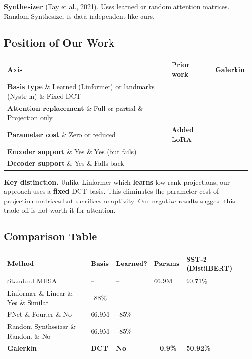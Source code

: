 \textbf{Synthesizer} (Tay et al., 2021). Uses learned or random attention 
matrices. Random Synthesizer is data-independent like ours.

\subsection{Position of Our Work}

\begin{table}[H]
\centering
\small
\begin{tabular}{lll}
\toprule
\textbf{Axis} & \textbf{Prior work} & \textbf{Galerkin} \\
\midrule
\textbf{Basis type} \& Learned (Linformer) or landmarks (Nystr m) \& Fixed DCT \\
\textbf{Attention replacement} \& Full or partial \& Projection only \\
\textbf{Parameter cost} \& Zero or reduced & \textbf{Added LoRA} \\
\textbf{Encoder support} \& Yes \& Yes (but fails) \\
\textbf{Decoder support} \& Yes \& Falls back \\
\bottomrule
\end{tabular}
\end{table}

\textbf{Key distinction.} Unlike Linformer which \textbf{learns} low-rank projections, 
our approach uses a \textbf{fixed} DCT basis. This eliminates the parameter cost 
of projection matrices but sacrifices adaptivity. Our negative results 
suggest this trade-off is not worth it for attention.



\subsection{Comparison Table}

\begin{table}[H]
\centering
\small
\begin{tabular}{lllll}
\toprule
\textbf{Method} & \textbf{Basis} & \textbf{Learned?} & \textbf{Params} & \textbf{SST-2 (DistilBERT)} \\
\midrule
Standard MHSA & -- & -- & 66.9M & 90.71\% \\
Linformer \& Linear \& Yes \& Similar & ~88\% \\
FNet \& Fourier \& No & 66.9M & ~85\% \\
Random Synthesizer \& Random \& No & 66.9M & ~85\% \\
\textbf{Galerkin} & \textbf{DCT} & \textbf{No} & \textbf{+0.9\%} & \textbf{50.92\%} \\
\bottomrule
\end{tabular}
\end{table}

